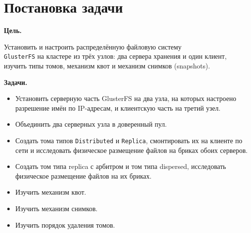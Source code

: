 
\section{Постановка задачи}

\textbf{Цель.}

Установить и настроить распределённую файловую систему \\
\texttt{GlusterFS} на кластере из трёх узлов: два сервера хранения и один клиент,
изучить типы томов, механизм квот и механизм снимков (snapshots).

\textbf{Задачи.}
\begin{itemize}
    \item Установить серверную часть GlusterFS на два узла, на которых настроено
    разрешение имён по IP-адресам, и клиентскую часть на третий узел.
    \item Объединить два серверных узла в доверенный пул.
    \item Создать тома типов \texttt{Distributed} и \texttt{Replica}, смонтировать их на клиенте 
    по сети и исследовать физическое размещение файлов на бриках 
    обоих серверов.
    \item Создать том типа replica с арбитром и том типа
    dispersed, исследовать физическое размещение файлов на их
    бриках.
    \item Изучить механизм квот.
    \item Изучить механизм снимков.
    \item Изучить порядок удаления томов.
\end{itemize}


